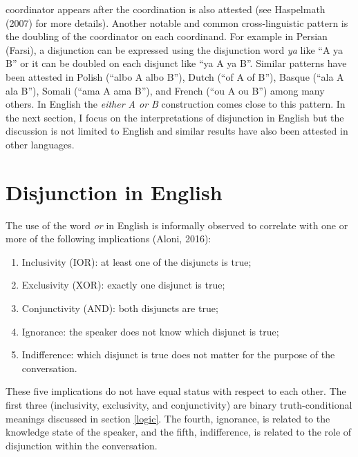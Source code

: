 \documentclass[oneside]{report}
\theoremstyle{definition}
\theoremstyle{definition}
\theoremstyle{definition}
\theoremstyle{remark}
\begin{document}
coordinator appears after the coordination is also attested (see
Haspelmath (2007) for more details). Another notable and common
cross-linguistic pattern is the doubling of the coordinator on each
coordinand. For example in Persian (Farsi), a disjunction can be
expressed using the disjunction word \emph{ya} like ``A ya B'' or it can
be doubled on each disjunct like ``ya A ya B''. Similar patterns have
been attested in Polish (``albo A albo B''), Dutch (``of A of B''),
Basque (``ala A ala B''), Somali (``ama A ama B''), and French (``ou A
ou B'') among many others. In English the \emph{either A or B}
construction comes close to this pattern. In the next section, I focus
on the interpretations of disjunction in English but the discussion is
not limited to English and similar results have also been attested in
other languages.

\section{Disjunction in English}\label{disjunction-in-english}

The use of the word \emph{or} in English is informally observed to
correlate with one or more of the following implications (Aloni, 2016):
\begin{enumerate}
\def\labelenumi{\arabic{enumi}.}
\tightlist
\item
  Inclusivity (IOR): at least one of the disjuncts is true;
\item
  Exclusivity (XOR): exactly one disjunct is true;
\item
  Conjunctivity (AND): both disjuncts are true;
\item
  Ignorance: the speaker does not know which disjunct is true;
\item
  Indifference: which disjunct is true does not matter for the purpose
  of the conversation.
\end{enumerate}
These five implications do not have equal status with respect to each
other. The first three (inclusivity, exclusivity, and conjunctivity) are
binary truth-conditional meanings discussed in section \ref{logic}. The
fourth, ignorance, is related to the knowledge state of the speaker, and
the fifth, indifference, is related to the role of disjunction within
the conversation.
\end{document}
